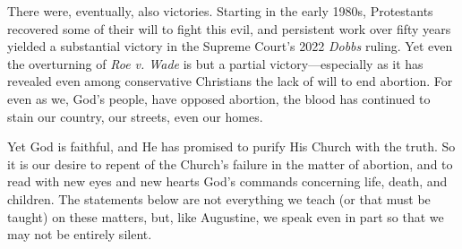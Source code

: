 \documentclass[
]{book}
\begin{document}
There were, eventually, also victories. Starting in the early 1980s, Protestants recovered some of their will to fight this evil, and persistent work over fifty years yielded a substantial victory in the Supreme Court's 2022 \emph{Dobbs} ruling. Yet even the overturning of \emph{Roe v. Wade} is but a partial victory---especially as it has revealed even among conservative Christians the lack of will to end abortion. For even as we, God's people, have opposed abortion, the blood has continued to stain our country, our streets, even our homes.

Yet God is faithful, and He has promised to purify His Church with the truth. So it is our desire to repent of the Church's failure in the matter of abortion, and to read with new eyes and new hearts God's commands concerning life, death, and children. The statements below are not everything we teach (or that must be taught) on these matters, but, like Augustine, we speak even in part so that we may not be entirely silent.
\end{document}
